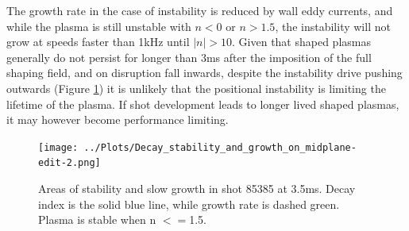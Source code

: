 \documentclass[aps,prl,twocolumn,superscriptaddress,groupedaddress]{revtex4}  %
\begin{document}
	\par The growth rate in the case of instability is reduced by wall eddy currents, and while the plasma is still unstable with $n < 0$ or $n > 1.5$, the instability will not grow at speeds faster than 1kHz until $|n| > 10$.  %
	Given that shaped plasmas generally do not persist for longer than 3ms after the imposition of the full shaping field, and on disruption fall inwards, despite the instability drive pushing outwards (Figure \ref{decay_index_and growth}) it is unlikely that the positional instability is limiting the lifetime of the plasma.  If shot development leads to longer lived shaped plasmas, it may however become performance limiting.
\begin{figure}[htb]
\centering
\texttt{[image: ../Plots/Decay\_stability\_and\_growth\_on\_midplane-edit-2.png]}
\caption{Areas of stability and slow growth in shot 85385 at 3.5ms. Decay index is the solid blue line, while growth rate is dashed green. Plasma is stable when n $<=$1.5.}
\label{decay_index_and growth}
\end{figure}
\end{document}

